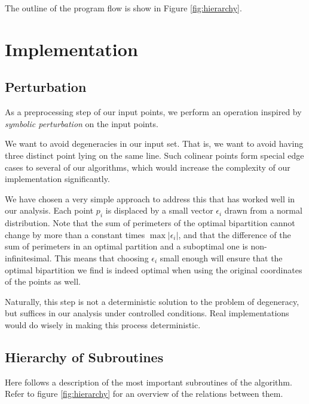 \documentclass{article}
\newcommand{\figref}[1]{Figure \ref{#1}}
\begin{document}
The outline of the program flow is show in \figref{fig:hierarchy}.

\section{Implementation} \label{sec:implementation}

\subsection{Perturbation}

As a preprocessing step of our input points, we perform an operation inspired by \textit{symbolic perturbation} \cite{edelsbrunner90} on the input points. 

We want to avoid degeneracies in our input set. That is, we want to avoid having three distinct point lying on the same line. Such colinear points form special edge cases to several of our algorithms, which would increase the complexity of our implementation significantly. 

We have chosen a very simple approach to address this that has worked well in our analysis. Each point $p_i$ is displaced by a small vector $\epsilon_i$ drawn from a normal distribution. Note that the sum of perimeters of the optimal bipartition cannot change by more than a constant times $\max |\epsilon_i|$, and that the difference of the sum of perimeters in an optimal partition and a suboptimal one is non-infinitesimal. This means that choosing $\epsilon_i$ small enough will ensure that the optimal bipartition we find is indeed optimal when using the original coordinates of the points as well.

Naturally, this step is not a deterministic solution to the problem of degeneracy, but suffices in our analysis under controlled conditions. Real implementations would do wisely in making this process deterministic.

\subsection{Hierarchy of Subroutines}

Here follows a description of the most important subroutines of the algorithm. Refer to figure \ref{fig:hierarchy} for an overview of the relations between them. 
\end{document}
